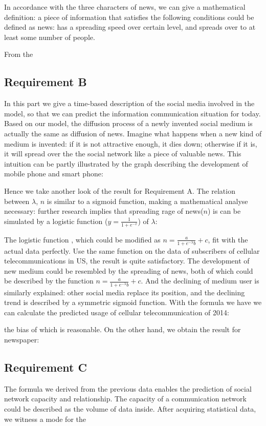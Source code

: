 In accordance with the three characters of news, we can give a mathematical definition: a piece of information that satisfies the following conditions could be defined as news: has a spreading speed over certain level, and spreads over to at least some number of people.

From the 
\subsection{Requirement B}
In this part we give a time-based description of the social media involved in the model, so that we can predict the information communication situation for today. Based on our model, the diffusion process of a newly invented social medium is actually the same as diffusion of news. Imagine what happens when a new kind of medium is invented: if it is not attractive enough, it dies down; otherwise if it is, it will spread over the the social network like a piece of valuable news. This intuition can be partly illustrated by the graph describing the development of mobile phone and smart phone:

Hence we take another look of the result for Requirement A. The relation between $\lambda$, $n$ is similar to a sigmoid function, making a mathematical analyse necessary: further research implies that spreading rage of news($n$) is can be simulated by a logistic function ($y = \frac{1}{1 + e^{-x}}$) of $\lambda$:

The logistic function , which could be modified as $n = \frac{a}{1 + e^{-\lambda}b}+c$, fit with the actual data perfectly. Use the same function on the data of subscribers of cellular telecommunications in US, the result is quite satisfactory. The development of new medium could be resembled by the spreading of news, both of which could be described by the function $n = \frac{a}{1 + e^{-\lambda}b}+c$. And the declining of medium user is similarly explained: other social media replace its position, and the declining trend is described by a symmetric sigmoid function. 
With the formula we have we can calculate the predicted usage of cellular telecommunication of 2014: 

the bias of which is reasonable. On the other hand, we obtain the result for newspaper:

\subsection{Requirement C}
The formula we derived from the previous data enables the prediction of social network capacity and relationship.
The capacity of a communication network could be described as the volume of data inside. After acquiring statistical data, we witness a mode for the 

